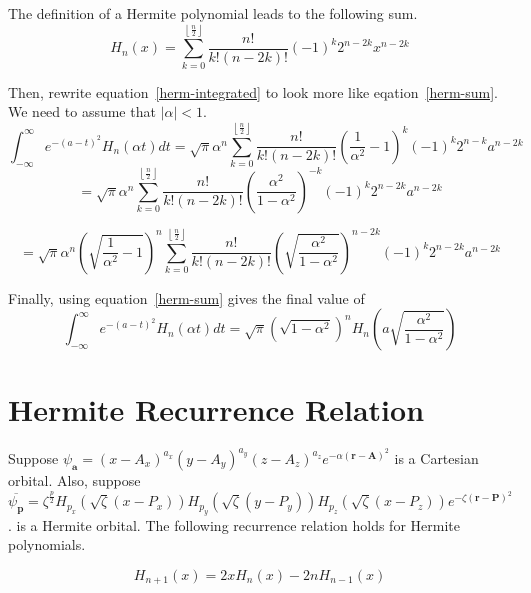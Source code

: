 \documentclass{article}
\begin{document}
The definition of a Hermite polynomial leads to the following sum.
\begin{equation}
  H_n(x) = \sum_{k = 0}^{\left\lfloor\frac{n}{2}\right\rfloor} \frac{n!}{k!(n - 2k)!}(-1)^k 2^{n - 2k} x^{n - 2k}
  \label{herm-sum}
\end{equation}

Then, rewrite equation~\ref{herm-integrated} to look more like eqation~\ref{herm-sum}. We need to assume that $\left|\alpha \right| < 1$.
$$\int_{-\infty}^\infty e^{-(a - t)^2} H_n(\alpha t) dt = \sqrt{\pi} \alpha^n \sum_{k = 0}^{\left\lfloor\frac{n}{2}\right\rfloor} \frac{n!}{k!(n - 2k)!} \left(\frac{1}{\alpha^2} - 1\right)^k (-1)^k 2^{n - k} a^{n - 2k}$$
$$ = \sqrt{\pi} \alpha^n \sum_{k = 0}^{\left\lfloor\frac{n}{2}\right\rfloor} \frac{n!}{k!(n - 2k)!} \left(\frac{\alpha^2}{1 - \alpha^2}\right)^{-k} (-1)^k 2^{n - 2k} a^{n - 2k}$$

\begin{equation}
  = \sqrt{\pi} \alpha^n \left(\sqrt{\frac{1}{\alpha^2} - 1}\right)^n \sum_{k = 0}^{\left\lfloor\frac{n}{2}\right\rfloor} \frac{n!}{k!(n - 2k)!} \left(\sqrt{\frac{\alpha^2}{1 - \alpha^2}}\right)^{n - 2k} (-1)^k 2^{n - 2k} a^{n - 2k}
  \label{herm-rearranged}
\end{equation}

Finally, using equation~\ref{herm-sum} gives the final value of
\begin{equation}
  \int_{-\infty}^\infty e^{-(a - t)^2} H_n(\alpha t) dt = \sqrt{\pi}\left(\sqrt{1 - \alpha^2}\right)^n H_n\left(a\sqrt{\frac{\alpha^2}{1 - \alpha^2}}\right)
  \label{herm-int-solved}
\end{equation}
  

\section{Hermite Recurrence Relation}

Suppose $\psi_{\mathbf{a}} = \left(x - A_x\right)^{a_x}\left(y - A_y\right)^{a_y}\left(z - A_z\right)^{a_z}e^{-\alpha\left(\mathbf{r} - \mathbf{A}\right)^2}$ is a Cartesian orbital. Also, suppose $\overline{\psi_{\mathbf{p}}} = \zeta^{\frac{p}{2}} H_{p_x}\left(\sqrt{\zeta} \left(x - P_x\right)\right)H_{p_y}\left(\sqrt{\zeta} \left(y - P_y\right)\right)H_{p_z}\left(\sqrt{\zeta} \left(x - P_z\right)\right) e^{-\zeta\left(\mathbf{r} - \mathbf{P}\right)^2}$. is a Hermite orbital. The following recurrence relation holds for Hermite polynomials.

\begin{equation}
  H_{n + 1}(x) = 2xH_{n}(x) - 2nH_{n - 1}(x)
  \label{herm-recur}
\end{equation}
\end{document}
